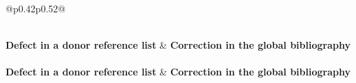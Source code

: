{\small
\begin{longtable}{@{}p{}p{}@{}}
\caption{Bibliography errata: defects in entries inherited from the articles'
reference lists and the corrections applied in the global bibliography. Keys in
typewriter font.}
\label{tab:apx:bib-errata} \\
\toprule
\textbf{Defect in a donor reference list} & \textbf{Correction in the global
bibliography} \\
\midrule
\endfirsthead
{}\\
\toprule
\textbf{Defect in a donor reference list} & \textbf{Correction in the global
bibliography} \\
\midrule
\endhead
\midrule
{}\\
\endfoot
\bottomrule
\endlastfoot


\end{longtable}}
